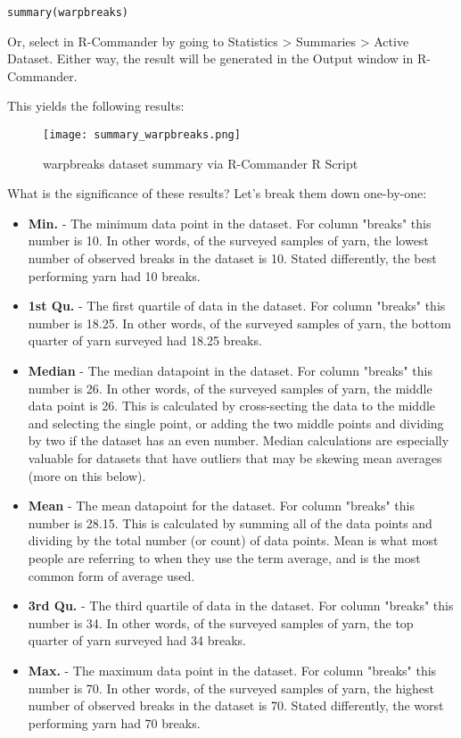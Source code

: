 \texttt{summary(warpbreaks)}

Or, select in R-Commander by going to Statistics > Summaries > Active Dataset. 
Either way, the result will be generated in the Output window in R-Commander.

This yields the following results:

\begin{figure}[htbp]
\texttt{[image: summary\_warpbreaks.png]}
 \caption{warpbreaks dataset summary via R-Commander R Script}
 \label{fig:summary_warpbreaks}
\end{figure}

What is the significance of these results? Let's break them down one-by-one:

\begin{itemize}
 \item \textbf{Min.} - The minimum data point in the dataset. For column 
 "breaks" this number is 10. In other words, of the surveyed samples of yarn, 
 the lowest number of observed breaks in the dataset is 10. Stated differently,
  the best performing yarn had 10 breaks.
 \item \textbf{1st Qu.} - The first quartile of data in the dataset. For column
  "breaks" this number is 18.25. In other words, of the surveyed samples of 
  yarn, the bottom quarter of yarn surveyed had 18.25 breaks.
 \item \textbf{Median} - The median datapoint in the dataset. For column 
 "breaks" this number is 26. In other words, of the surveyed samples of yarn, 
 the middle data point is 26. This is calculated by cross-secting the data to 
 the middle and selecting the single point, or adding the two middle points and
  dividing by two if the dataset has an even number. Median calculations are 
  especially valuable for datasets that have outliers that may be skewing mean 
  averages (more on this below).
 \item \textbf{Mean} - The mean datapoint for the dataset. For column "breaks" 
 this number is 28.15. This is calculated by summing all of the data points and
  dividing by the total number (or count) of data points. Mean is what most 
  people are referring to when they use the term average, and is the most 
  common form of average used.
 \item \textbf{3rd Qu.} - The third quartile of data in the dataset. For column
  "breaks" this number is 34. In other words, of the surveyed samples of yarn, 
  the top quarter of yarn surveyed had 34 breaks.
 \item \textbf{Max.} - The maximum data point in the dataset. For column 
 "breaks" this number is 70. In other words, of the surveyed samples of yarn, 
 the highest number of observed breaks in the dataset is 70. Stated 
 differently, the worst performing yarn had 70 breaks.
\end{itemize}

